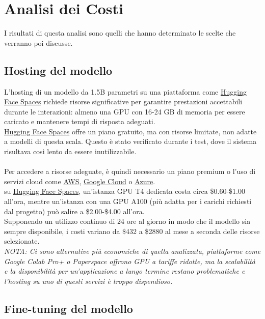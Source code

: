 \documentclass[11pt]{article}
\begin{document}
\section{Analisi dei Costi} \label{AdC}
I risultati di questa analisi sono quelli che hanno determinato le scelte che verranno poi discusse.
\subsection{Hosting del modello} \label{HdM}
L’hosting di un modello da 1.5B parametri su una piattaforma come \href{https://huggingface.co/spaces}{Hugging Face Spaces} 
richiede risorse significative per garantire prestazioni accettabili durante le interazioni: 
almeno una GPU con 16-24 GB di memoria per essere caricato e mantenere tempi di risposta adeguati.\\
\href{https://huggingface.co/spaces}{Hugging Face Spaces} offre un piano gratuito, ma con risorse limitate, 
non adatte a modelli di questa scala. Questo è stato verificato durante i test, 
dove il sistema risultava così lento da essere inutilizzabile.\\\\
Per accedere a risorse adeguate, è quindi necessario un piano premium o l’uso di servizi cloud 
come \href{https://aws.amazon.com/it/}{AWS}, \href{https://cloud.google.com/}{Google Cloud} o 
\href{https://portal.azure.com/}{Azure}.\\
su \href{https://huggingface.co/spaces}{Hugging Face Spaces}, un'istanza GPU T4 dedicata costa circa \$0.60-\$1.00 all'ora, 
mentre un'istanza con una GPU A100 (più adatta per i carichi richiesti dal 
progetto) può salire a \$2.00-\$4.00 all'ora.\\
Supponendo un utilizzo continuo di 24 ore al giorno in modo che il modello sia sempre disponibile, 
i costi variano da \$432 a \$2880 al mese a seconda delle risorse selezionate.\\
\textit{NOTA: Ci sono alternative più economiche di quella analizzata,
piattaforme come Google Colab Pro+ o Paperspace offrono GPU a tariffe ridotte, 
ma la scalabilità e la disponibilità per un’applicazione a lungo termine restano 
problematiche e l'hosting su uno di questi servizi è troppo dispendioso.}
\newpage
\subsection{Fine-tuning del modello}
\end{document}

